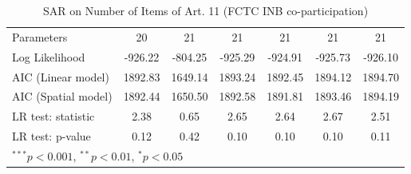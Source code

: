 \begin{table}[!h]
\begin{center}
\begin{tabular}{l c c c c c c }
Parameters              & 20           & 21           & 21           & 21           & 21           & 21           \\
Log Likelihood          & -926.22      & -804.25      & -925.29      & -924.91      & -925.73      & -926.10      \\
AIC (Linear model)      & 1892.83      & 1649.14      & 1893.24      & 1892.45      & 1894.12      & 1894.70      \\
AIC (Spatial model)     & 1892.44      & 1650.50      & 1892.58      & 1891.81      & 1893.46      & 1894.19      \\
LR test: statistic      & 2.38         & 0.65         & 2.65         & 2.64         & 2.67         & 2.51         \\
LR test: p-value        & 0.12         & 0.42         & 0.10         & 0.10         & 0.10         & 0.11         \\
\bottomrule
\multicolumn{7}{l}{\scriptsize{$^{***}p<0.001$, $^{**}p<0.01$, $^*p<0.05$}}
\end{tabular}
\caption{SAR on Number of Items of Art. 11 (FCTC INB co-participation)}
\label{table:coefficients}
\end{center}
\end{table}
